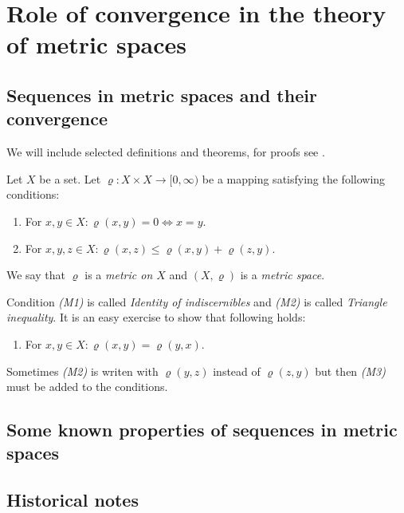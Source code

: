 \chapter{Role of convergence in the theory of metric spaces}

\section{Sequences in metric spaces and their convergence}
{\color{blue}

We will include selected definitions and theorems, for proofs see \cite{cech66}.
\begin{define}\label{def:mp}
Let $X$ be a set. Let $\varrho: X\times X \to [0,\infty)$ be a mapping satisfying the following conditions:
\begin{enumerate}
	\item[(M1)] For $x,y\in X: \varrho(x,y)=0 \Leftrightarrow x = y$.
	\item[(M2)] For $x,y,z\in X: \varrho(x,z) \le \varrho(x,y) + \varrho(z,y)$.
\end{enumerate}
We say that $\varrho$ is a \emph{metric on $X$} and $(X,\varrho)$ is a \emph{metric space}.
\end{define}
Condition \emph{(M1)} is called \emph{Identity of indiscernibles} and \emph{(M2)} is called \emph{Triangle inequality}. It is an easy exercise to show that following holds:
\begin{enumerate}
	\item[(M3)] For $x,y\in X: \varrho(x,y)=\varrho(y,x)$.
\end{enumerate}
Sometimes \emph{(M2)} is writen with $\varrho(y,z)$ instead of $\varrho(z,y)$ but then \emph{(M3)} must be added to the conditions.
}
\section{Some known properties of sequences in metric spaces}

\section{Historical notes}

